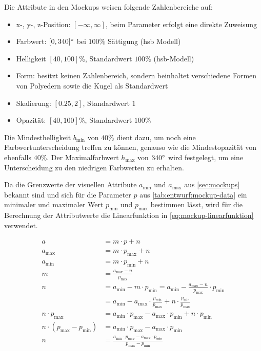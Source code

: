 Die Attribute in den Mockups weisen folgende Zahlenbereiche auf:
\begin{itemize}
	\item x-, y-, z-Position: $[-\infty, \infty]$, beim Parameter  erfolgt eine direkte Zuweisung 
	\item Farbwert: $[0, 340]\degree$ bei $100\%$ Sättigung (\gls{hsb} Modell)
	\item Helligkeit $[40, 100]\%$, Standardwert $100\%$ (\gls{hsb}-Modell)
	\item Form: besitzt keinen Zahlenbereich, sondern beinhaltet verschiedene Formen von Polyedern sowie die Kugel als Standardwert
	\item Skalierung: $[0.25,2]$, Standardwert $1$
	\item Opazität: $[40, 100]\%$, Standardwert $100\%$
\end{itemize}
Die Mindesthelligkeit $b_{\text{min}}$ von $40\%$ dient dazu, um noch eine Farbwertunterscheidung treffen zu können, genauso wie die Mindestopazität von ebenfalls $40\%$. Der Maximalfarbwert $h_{\text{max}}$ von $340\degree$ wird festgelegt, um eine Unterscheidung zu den niedrigen Farbwerten zu erhalten.

Da die Grenzwerte der visuellen Attribute $a_{\text{min}}$ und $a_{\text{max}}$ aus \autoref{sec:mockups} bekannt sind und sich für die Parameter $p$ aus \autoref{tab:entwurf:mockup-data} ein minimaler und maximaler Wert $p_{\text{min}}$ und $p_{\text{max}}$ bestimmen lässt, wird für die Berechnung der Attributwerte die Linearfunktion in \autoref{eq:mockup-linearfunktion} verwendet.

\begin{equation}
\begin{aligned}\label{eq:mockup-linearfunktion}
a &= m \cdot p + n\\
a_{\text{max}} &= m \cdot p_{\text{max}} + n\\
a_{\text{min}} &= m \cdot p_{\text{min}} + n\\
m &= \boxed{\frac{a_{\text{max}} - n}{p_{\text{max}}}}\\
n &= a_{\text{min}} - m \cdot {p_{\text{min}}} = a_{\text{min}} - \frac{a_{\text{max}} - n}{p_{\text{max}}} \cdot p_{\text{min}}\\
&= a_{\text{min}} - a_{\text{max}} \cdot \frac {p_{\text{min}}}{p_{\text{max}}} + n \cdot \frac {p_{\text{min}}}{p_{\text{max}}}\\
n \cdot p_{\text{max}} &= a_{\text{min}} \cdot p_{\text{max}} - a_{\text{max}} \cdot p_{\text{min}} + n \cdot p_{\text{min}}\\
n \cdot \left( p_{\text{max}} - p_{\text{min}}\right) &= a_{\text{min}} \cdot p_{\text{max}} - a_{\text{max}} \cdot p_{\text{min}}\\
n &= \boxed{\frac{a_{\text{min}} \cdot p_{\text{max}} - a_{\text{max}} \cdot p_{\text{min}}}{p_{\text{max}} - p_{\text{min}}}}\\
\end{aligned}
\end{equation}

